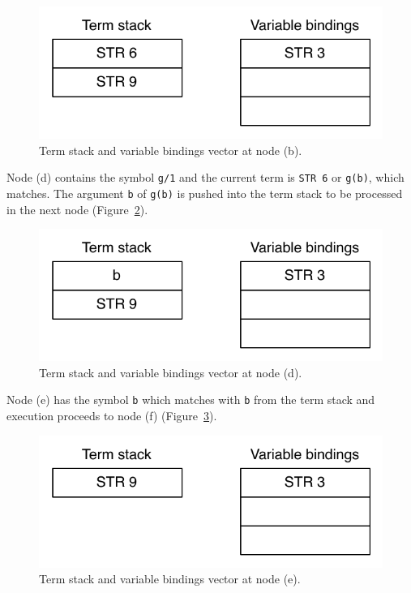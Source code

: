 \begin{figure}[H]
  \centering
    \includegraphics[scale=0.5]{collect_functor2.pdf}
  \caption{Term stack and variable bindings vector at node (b).}
  \label{fig:collect_functor2}
\end{figure}

Node (d) contains the symbol \texttt{g/1} and the current term is \texttt{STR 6}
or \texttt{g(b)}, which matches. The argument \texttt{b} of \texttt{g(b)}
is pushed into the term stack to be processed in the next node (Figure~\ref{fig:collect_functor3}).

\begin{figure}[H]
  \centering
    \includegraphics[scale=0.5]{collect_functor3.pdf}
  \caption{Term stack and variable bindings vector at node (d).}
  \label{fig:collect_functor3}
\end{figure}

Node (e) has the symbol \texttt{b} which matches with \texttt{b} from the term stack and
execution proceeds to node (f) (Figure~\ref{fig:collect_functor4}).

\begin{figure}[H]
  \centering
    \includegraphics[scale=0.5]{collect_functor4.pdf}
  \caption{Term stack and variable bindings vector at node (e).}
  \label{fig:collect_functor4}
\end{figure}

